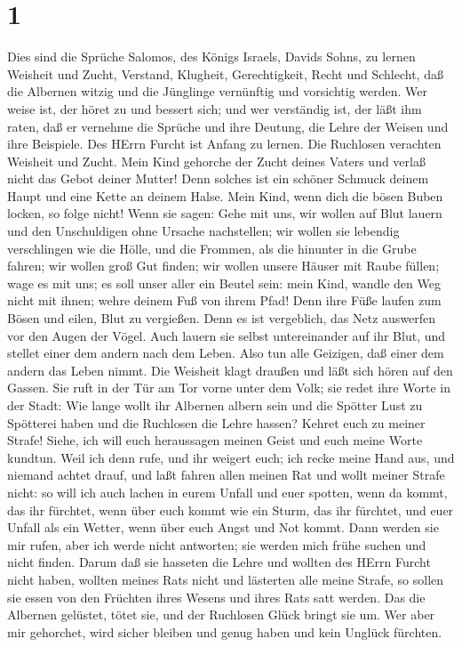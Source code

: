 \hypertarget{section}{%
\section{1}\label{section}}

 Dies sind die Sprüche Salomos, des Königs Israels, Davids
Sohns,  zu lernen Weisheit und Zucht, Verstand, 
Klugheit, Gerechtigkeit, Recht und Schlecht,  daß die
Albernen witzig und die Jünglinge vernünftig und vorsichtig werden.
 Wer weise ist, der höret zu und bessert sich; und wer
verständig ist, der läßt ihm raten,  daß er vernehme die
Sprüche und ihre Deutung, die Lehre der Weisen und ihre Beispiele.
 Des HErrn Furcht ist Anfang zu lernen. Die Ruchlosen
verachten Weisheit und Zucht.  Mein Kind gehorche der Zucht
deines Vaters und verlaß nicht das Gebot deiner Mutter! 
Denn solches ist ein schöner Schmuck deinem Haupt und eine Kette an
deinem Halse.  Mein Kind, wenn dich die bösen Buben locken,
so folge nicht!  Wenn sie sagen: Gehe mit uns, wir wollen
auf Blut lauern und den Unschuldigen ohne Ursache nachstellen;
 wir wollen sie lebendig verschlingen wie die Hölle, und
die Frommen, als die hinunter in die Grube fahren;  wir
wollen groß Gut finden; wir wollen unsere Häuser mit Raube füllen;
 wage es mit uns; es soll unser aller ein Beutel sein:
 mein Kind, wandle den Weg nicht mit ihnen; wehre deinem
Fuß von ihrem Pfad!  Denn ihre Füße laufen zum Bösen und
eilen, Blut zu vergießen.  Denn es ist vergeblich, das Netz
auswerfen vor den Augen der Vögel.  Auch lauern sie selbst
untereinander auf ihr Blut, und stellet einer dem andern nach dem Leben.
 Also tun alle Geizigen, daß einer dem andern das Leben
nimmt.  Die Weisheit klagt draußen und läßt sich hören auf
den Gassen.  Sie ruft in der Tür am Tor vorne unter dem
Volk; sie redet ihre Worte in der Stadt:  Wie lange wollt
ihr Albernen albern sein und die Spötter Lust zu Spötterei haben und die
Ruchlosen die Lehre hassen?  Kehret euch zu meiner Strafe!
Siehe, ich will euch heraussagen meinen Geist und euch meine Worte
kundtun.  Weil ich denn rufe, und ihr weigert euch; ich
recke meine Hand aus, und niemand achtet drauf,  und laßt
fahren allen meinen Rat und wollt meiner Strafe nicht:  so
will ich auch lachen in eurem Unfall und euer spotten, wenn da kommt,
das ihr fürchtet,  wenn über euch kommt wie ein Sturm, das
ihr fürchtet, und euer Unfall als ein Wetter, wenn über euch Angst und
Not kommt.  Dann werden sie mir rufen, aber ich werde nicht
antworten; sie werden mich frühe suchen und nicht finden. 
Darum daß sie hasseten die Lehre und wollten des HErrn Furcht nicht
haben,  wollten meines Rats nicht und lästerten alle meine
Strafe,  so sollen sie essen von den Früchten ihres Wesens
und ihres Rats satt werden.  Das die Albernen gelüstet,
tötet sie, und der Ruchlosen Glück bringt sie um.  Wer aber
mir gehorchet, wird sicher bleiben und genug haben und kein Unglück
fürchten.

